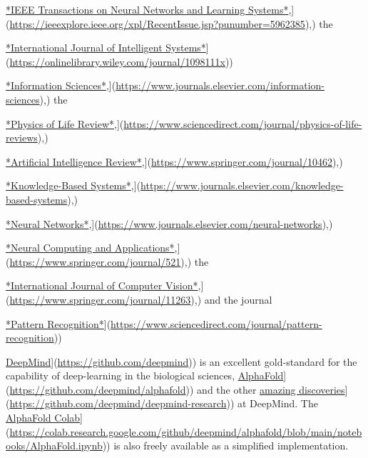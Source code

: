 \documentclass[
]{book}
\begin{document}
\href{\%5Bhttps://ieeexplore.ieee.org/xpl/RecentIssue.jsp?punumber=5962385}{*IEEE Transactions on Neural Networks and Learning Systems*},{]}(\url{https://ieeexplore.ieee.org/xpl/RecentIssue.jsp?punumber=5962385}),) the

\href{\%5Bhttps://onlinelibrary.wiley.com/journal/1098111x}{*International Journal of Intelligent Systems*}{]}(\url{https://onlinelibrary.wiley.com/journal/1098111x}))

\href{\%5Bhttps://www.journals.elsevier.com/information-sciences}{*Information Sciences*},{]}(\url{https://www.journals.elsevier.com/information-sciences}),) the

\href{\%5Bhttps://www.sciencedirect.com/journal/physics-of-life-reviews}{*Physics of Life Review*},{]}(\url{https://www.sciencedirect.com/journal/physics-of-life-reviews}),)

\href{\%5Bhttps://www.springer.com/journal/10462}{*Artificial Intelligence Review*},{]}(\url{https://www.springer.com/journal/10462}),)

\href{\%5Bhttps://www.journals.elsevier.com/knowledge-based-systems}{*Knowledge-Based Systems*},{]}(\url{https://www.journals.elsevier.com/knowledge-based-systems}),)

\href{\%5Bhttps://www.journals.elsevier.com/neural-networks}{*Neural Networks*},{]}(\url{https://www.journals.elsevier.com/neural-networks}),)

\href{\%5Bhttps://www.springer.com/journal/521}{*Neural Computing and Applications*},{]}(\url{https://www.springer.com/journal/521}),) the

\href{\%5Bhttps://www.springer.com/journal/11263}{*International Journal of Computer Vision*},{]}(\url{https://www.springer.com/journal/11263}),) and the journal

\href{\%5Bhttps://www.sciencedirect.com/journal/pattern-recognition}{*Pattern Recognition*}{]}(\url{https://www.sciencedirect.com/journal/pattern-recognition}))

\href{\%5Bhttps://github.com/deepmind}{DeepMind}{]}(\url{https://github.com/deepmind})) is an excellent gold-standard for the capability of deep-learning in the biological sciences, \href{\%5Bhttps://github.com/deepmind/alphafold}{AlphaFold}{]}(\url{https://github.com/deepmind/alphafold})) and the other \href{\%5Bhttps://github.com/deepmind/deepmind-research}{amazing discoveries}{]}(\url{https://github.com/deepmind/deepmind-research})) at DeepMind. The \href{\%5Bhttps://colab.research.google.com/github/deepmind/alphafold/blob/main/notebooks/AlphaFold.ipynb}{AlphaFold Colab}{]}(\url{https://colab.research.google.com/github/deepmind/alphafold/blob/main/notebooks/AlphaFold.ipynb})) is also freely available as a simplified implementation.
\end{document}

